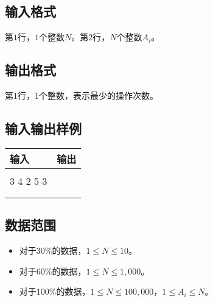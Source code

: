 \documentclass[a4paper]{article}
\newcommand{\inputformat}{\subsection{输入格式}}
\newcommand{\outputformat}{\subsection{输出格式}}
\newcommand{\sample}[2]{
\subsection{输入输出样例}
\begin{tabular}{|l|l|}
    \hline
    输入 & 输出 \\
    \hline
    \begin{minipage}[t]{200pt}
        \begin{ttfamily} #1 \end{ttfamily}
    \end{minipage} &
    \begin{minipage}[t]{200pt}
        \begin{ttfamily} #2 \end{ttfamily}
    \end{minipage} \\
    \hline
\end{tabular}
\vspace{1ex}
\par
}
\newcommand{\dataset}{\subsection{数据范围}}
\begin{document}
\inputformat{}

第$1$行，$1$个整数$N$。第$2$行，$N$个整数$A_i$。

\outputformat{}

第$1$行，$1$个整数，表示最少的操作次数。

\sample{
5 \\
3 4 2 5 3 \\
}{
3 \\
}

\dataset{}

\begin{itemize}
    \item 对于$30\%$的数据，$1 \leq N \leq 10$。

    \item 对于$60\%$的数据，$1 \leq N \leq 1,000$。

    \item 对于$100\%$的数据，$1 \leq N \leq 100,000$，$1 \leq A_i \leq N$。
\end{itemize}
\end{document}
